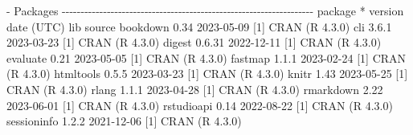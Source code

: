 \documentclass[
  10pt,
  a4paper,
]{book}
\newenvironment{Shaded}{\begin{snugshade}}{\end{snugshade}}
\newcommand{\DecValTok}[1]{\textcolor[rgb]{0.68,0.00,0.00}{#1}}
\newcommand{\FloatTok}[1]{\textcolor[rgb]{0.68,0.00,0.00}{#1}}
\newcommand{\FunctionTok}[1]{\textcolor[rgb]{0.28,0.35,0.67}{#1}}
\newcommand{\NormalTok}[1]{\textcolor[rgb]{0.00,0.46,0.62}{#1}}
\newcommand{\SpecialCharTok}[1]{\textcolor[rgb]{0.37,0.37,0.37}{#1}}
\begin{document}
\begin{Shaded}
\begin{Highlighting}[]
\SpecialCharTok{{-}}\NormalTok{ Packages }\SpecialCharTok{{-}{-}{-}{-}{-}{-}{-}{-}{-}{-}{-}{-}{-}{-}{-}{-}{-}{-}{-}{-}{-}{-}{-}{-}{-}{-}{-}{-}{-}{-}{-}{-}{-}{-}{-}{-}{-}{-}{-}{-}{-}{-}{-}{-}{-}{-}{-}{-}{-}{-}{-}{-}{-}{-}{-}{-}{-}{-}{-}{-}{-}{-}{-}{-}{-}{-}{-}}
\NormalTok{ package       }\SpecialCharTok{*}\NormalTok{ version }\FunctionTok{date}\NormalTok{ (UTC) lib source}
\NormalTok{ bookdown        }\FloatTok{0.34}    \DecValTok{2023{-}05{-}09}\NormalTok{ [}\DecValTok{1}\NormalTok{] }\FunctionTok{CRAN}\NormalTok{ (R }\DecValTok{4}\NormalTok{.}\FloatTok{3.0}\NormalTok{)}
\NormalTok{ cli             }\DecValTok{3}\NormalTok{.}\FloatTok{6.1}   \DecValTok{2023{-}03{-}23}\NormalTok{ [}\DecValTok{1}\NormalTok{] }\FunctionTok{CRAN}\NormalTok{ (R }\DecValTok{4}\NormalTok{.}\FloatTok{3.0}\NormalTok{)}
\NormalTok{ digest          }\DecValTok{0}\NormalTok{.}\FloatTok{6.31}  \DecValTok{2022{-}12{-}11}\NormalTok{ [}\DecValTok{1}\NormalTok{] }\FunctionTok{CRAN}\NormalTok{ (R }\DecValTok{4}\NormalTok{.}\FloatTok{3.0}\NormalTok{)}
\NormalTok{ evaluate        }\FloatTok{0.21}    \DecValTok{2023{-}05{-}05}\NormalTok{ [}\DecValTok{1}\NormalTok{] }\FunctionTok{CRAN}\NormalTok{ (R }\DecValTok{4}\NormalTok{.}\FloatTok{3.0}\NormalTok{)}
\NormalTok{ fastmap         }\DecValTok{1}\NormalTok{.}\FloatTok{1.1}   \DecValTok{2023{-}02{-}24}\NormalTok{ [}\DecValTok{1}\NormalTok{] }\FunctionTok{CRAN}\NormalTok{ (R }\DecValTok{4}\NormalTok{.}\FloatTok{3.0}\NormalTok{)}
\NormalTok{ htmltools       }\DecValTok{0}\NormalTok{.}\FloatTok{5.5}   \DecValTok{2023{-}03{-}23}\NormalTok{ [}\DecValTok{1}\NormalTok{] }\FunctionTok{CRAN}\NormalTok{ (R }\DecValTok{4}\NormalTok{.}\FloatTok{3.0}\NormalTok{)}
\NormalTok{ knitr           }\FloatTok{1.43}    \DecValTok{2023{-}05{-}25}\NormalTok{ [}\DecValTok{1}\NormalTok{] }\FunctionTok{CRAN}\NormalTok{ (R }\DecValTok{4}\NormalTok{.}\FloatTok{3.0}\NormalTok{)}
\NormalTok{ rlang           }\DecValTok{1}\NormalTok{.}\FloatTok{1.1}   \DecValTok{2023{-}04{-}28}\NormalTok{ [}\DecValTok{1}\NormalTok{] }\FunctionTok{CRAN}\NormalTok{ (R }\DecValTok{4}\NormalTok{.}\FloatTok{3.0}\NormalTok{)}
\NormalTok{ rmarkdown       }\FloatTok{2.22}    \DecValTok{2023{-}06{-}01}\NormalTok{ [}\DecValTok{1}\NormalTok{] }\FunctionTok{CRAN}\NormalTok{ (R }\DecValTok{4}\NormalTok{.}\FloatTok{3.0}\NormalTok{)}
\NormalTok{ rstudioapi      }\FloatTok{0.14}    \DecValTok{2022{-}08{-}22}\NormalTok{ [}\DecValTok{1}\NormalTok{] }\FunctionTok{CRAN}\NormalTok{ (R }\DecValTok{4}\NormalTok{.}\FloatTok{3.0}\NormalTok{)}
\NormalTok{ sessioninfo     }\DecValTok{1}\NormalTok{.}\FloatTok{2.2}   \DecValTok{2021{-}12{-}06}\NormalTok{ [}\DecValTok{1}\NormalTok{] }\FunctionTok{CRAN}\NormalTok{ (R }\DecValTok{4}\NormalTok{.}\FloatTok{3.0}\NormalTok{)}

\end{Highlighting}
\end{Shaded}
\end{document}
